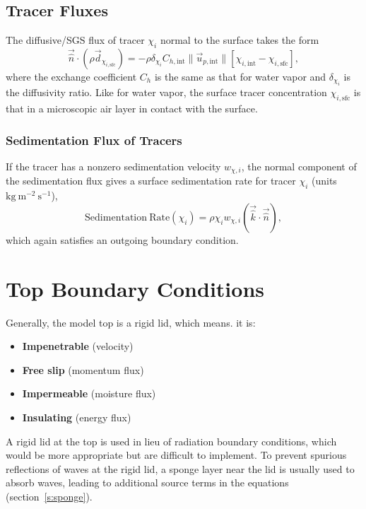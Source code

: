 \documentclass{report}
\begin{document}
\subsection{Tracer Fluxes}

The diffusive/SGS flux of tracer $\chi_i$ normal to the surface takes the form 
\begin{equation}\label{e:sfc_tracer}
 \vec{\hat n} \cdot (\rho \vec{d}_{\chi_{i, \mathrm{sfc}}}) = - \rho \delta_{\chi_i} C_{h, \mathrm{int}} \| \vec{u}_{p, \mathrm{int}} \| \left[\chi_{i, \mathrm{int}} - \chi_{i, \mathrm{sfc}} \right],
\end{equation} 
where the exchange coefficient $C_h$ is the same as that for water vapor and $\delta_{\chi_i}$ is the diffusivity ratio. Like for water vapor, the surface tracer concentration $\chi_{i, \mathrm{sfc}}$ is that in a microscopic air layer in contact with the surface.

\subsubsection{Sedimentation Flux of Tracers}

If the tracer has a nonzero sedimentation velocity $w_{\chi, i}$, the normal component of the sedimentation flux gives a surface sedimentation rate for tracer $\chi_i$ (units $\mathrm{kg~m^{-2}~s^{-1}}$), 
\begin{equation}
    \mathrm{Sedimentation~Rate}(\chi_i) = \rho \chi_{i} w_{\chi, i} (\vec{\hat k} \cdot \vec{\hat n}),
\end{equation}
which again satisfies an outgoing boundary condition. 

\section{Top Boundary Conditions} 

Generally, the model top is a rigid lid, which means. it is:
\begin{itemize}
    \item \textbf{Impenetrable} (velocity)
    \item \textbf{Free slip} (momentum flux)
    \item \textbf{Impermeable} (moisture flux)
    \item \textbf{Insulating} (energy flux)
\end{itemize}
A rigid lid at the top is used in lieu of radiation boundary conditions, which would be more appropriate but are difficult to implement. To prevent spurious reflections of waves at the rigid lid, a sponge layer near the lid is usually used to absorb waves, leading to additional source terms in the equations (section~\ref{s:sponge}).
\end{document}
